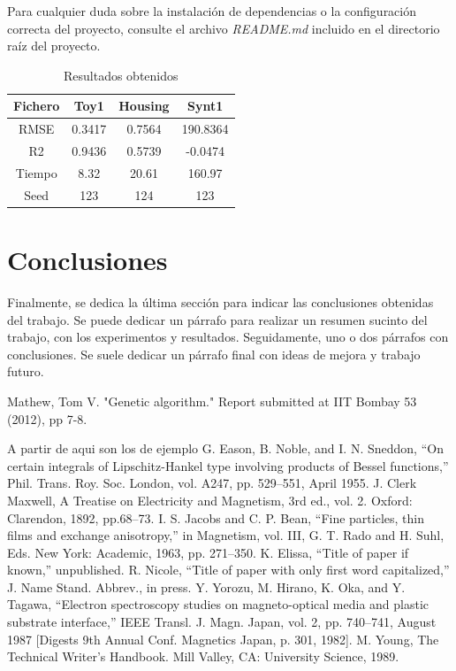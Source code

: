 \documentclass[conference,a4paper]{IEEEtran}
\begin{document}
Para cualquier duda sobre la instalación de dependencias o la configuración correcta del proyecto, consulte el archivo \textit{README.md} incluido en el directorio raíz del proyecto.


\begin{table} [h]
  \caption{Resultados obtenidos}
  \label{tab:resultados}
  \centering
  \begin{tabular}{cccc}
    \toprule
     Fichero & Toy1 & Housing & Synt1 \\
    \midrule
    RMSE & 0.3417 & 0.7564 & 190.8364 \\
    R2 & 0.9436 & 0.5739 & -0.0474 \\
    \midrule
    Tiempo & 8.32 & 20.61 & 160.97 \\
    Seed & 123 & 124 & 123 \\
    \bottomrule
  \end{tabular}
\end{table}


\section{Conclusiones}

Finalmente, se dedica la última sección para indicar las conclusiones obtenidas
del trabajo. Se puede dedicar un párrafo para realizar un resumen sucinto del
trabajo, con los experimentos y resultados. Seguidamente, uno o dos párrafos
con conclusiones. Se suele dedicar un párrafo final con ideas de mejora y
trabajo futuro.


\begin{thebibliography}{00}
Mathew, Tom V. "Genetic algorithm." Report submitted at IIT Bombay 53 (2012), pp 7-8.


A partir de aqui son los de ejemplo
 G. Eason, B. Noble, and I. N. Sneddon, ``On certain integrals of Lipschitz-Hankel type involving products of Bessel functions,'' Phil. Trans. Roy. Soc. London, vol. A247, pp. 529--551, April 1955.
 J. Clerk Maxwell, A Treatise on Electricity and Magnetism, 3rd ed., vol. 2. Oxford: Clarendon, 1892, pp.68--73.
 I. S. Jacobs and C. P. Bean, ``Fine particles, thin films and exchange anisotropy,'' in Magnetism, vol. III, G. T. Rado and H. Suhl, Eds. New York: Academic, 1963, pp. 271--350.
 K. Elissa, ``Title of paper if known,'' unpublished.
 R. Nicole, ``Title of paper with only first word capitalized,'' J. Name Stand. Abbrev., in press.
 Y. Yorozu, M. Hirano, K. Oka, and Y. Tagawa, ``Electron spectroscopy studies on magneto-optical media and plastic substrate interface,'' IEEE Transl. J. Magn. Japan, vol. 2, pp. 740--741, August 1987 [Digests 9th Annual Conf. Magnetics Japan, p. 301, 1982].
 M. Young, The Technical Writer's Handbook. Mill Valley, CA: University Science, 1989.
\end{thebibliography}
\end{document}
